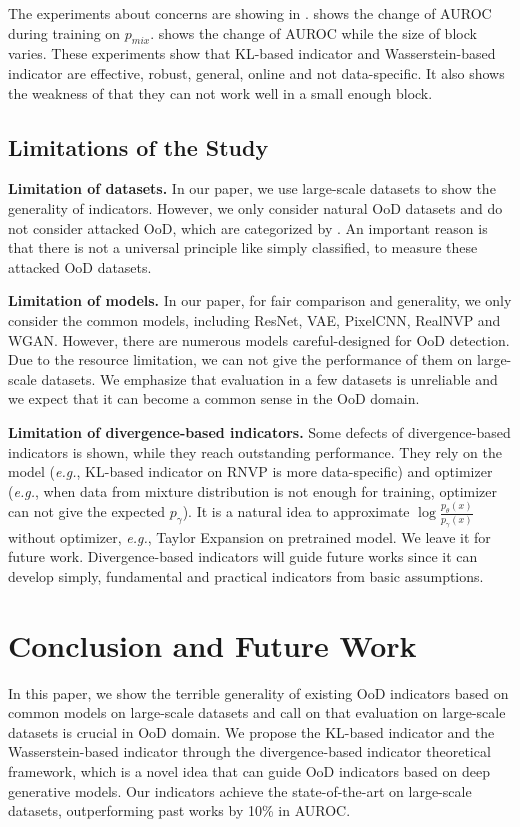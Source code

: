 \documentclass[letterpaper]{article} %
\newcommand{\EG}{\textit{e.g.}, }
\newcommand{\pmix}{p_{mix}}
\begin{document}
The experiments about concerns are showing in .  shows the change of AUROC during training on $\pmix$. 
 shows the change of AUROC while the size of block varies. 
These experiments show that KL-based indicator and Wasserstein-based indicator are effective, robust, general, online and not data-specific. It also shows the weakness of that they can not work well in a small enough block. 

\subsection{Limitations of the Study} 

\noindent \textbf{Limitation of datasets.}
In our paper, we use large-scale datasets to show the generality of indicators. However, we only consider natural OoD datasets and do not consider attacked OoD, which are categorized by \cite{chen2020robust}. An important reason is that there is not a universal principle like simply classified, to measure these attacked OoD datasets. 

\noindent \textbf{Limitation of models.} 
In our paper, for fair comparison and generality, we only consider the common models, including ResNet, VAE, PixelCNN, RealNVP and WGAN. However, there are numerous models careful-designed for OoD detection. Due to the resource limitation, we can not give the performance of them on large-scale datasets. We emphasize that evaluation in a few datasets is unreliable and we expect that it can become a common sense in the OoD domain. 

\noindent \textbf{Limitation of divergence-based indicators.} 
Some defects of divergence-based indicators is shown, while they reach outstanding performance. They rely on the model (\EG KL-based indicator on RNVP is more data-specific) and optimizer (\EG when data from mixture distribution is not enough for training, optimizer can not give the expected $p_\gamma$). It is a natural idea to approximate $\log \frac{ p_\theta(x)}{p_\gamma(x)}$ without optimizer, \EG Taylor Expansion on pretrained model. We leave it for future work. 
Divergence-based indicators will guide future works since it can develop simply, fundamental and practical indicators from basic assumptions. 

\section{Conclusion and Future Work}
In this paper, we show the terrible generality of existing OoD indicators based on common models on large-scale datasets and call on that evaluation on large-scale datasets is crucial in OoD domain. We propose the KL-based indicator and the Wasserstein-based indicator through the divergence-based indicator theoretical framework, which is a novel idea that can guide OoD indicators based on deep generative models. Our indicators achieve the state-of-the-art on large-scale datasets, outperforming past works by 10\% in AUROC.
\end{document}
